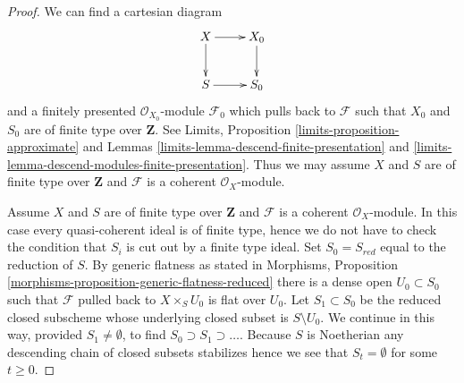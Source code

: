 \documentclass[10pt,a4paper]{amsart}
\theoremstyle{plain}
\theoremstyle{definition}
\theoremstyle{remark}
\numberwithin{equation}{subsection}
\begin{document}
\begin{proof}
We can find a cartesian diagram
$$
\xymatrix{
X \ar[d] \ar[r] & X_0 \ar[d] \\
S \ar[r] & S_0
}
$$
and a finitely presented $\mathcal{O}_{X_0}$-module $\mathcal{F}_0$
which pulls back to $\mathcal{F}$ such that $X_0$ and $S_0$ are of
finite type over $\mathbf{Z}$. See
Limits, Proposition \ref{limits-proposition-approximate} and
Lemmas \ref{limits-lemma-descend-finite-presentation} and
\ref{limits-lemma-descend-modules-finite-presentation}.
Thus we may assume $X$ and $S$ are of finite type over $\mathbf{Z}$
and $\mathcal{F}$ is a coherent $\mathcal{O}_X$-module.

\medskip\noindent
Assume $X$ and $S$ are of finite type over $\mathbf{Z}$
and $\mathcal{F}$ is a coherent $\mathcal{O}_X$-module.
In this case every quasi-coherent ideal is of finite type, hence
we do not have to check the condition that $S_i$ is cut out
by a finite type ideal. Set $S_0 = S_{red}$ equal to the reduction of $S$.
By generic flatness as stated in Morphisms, Proposition
\ref{morphisms-proposition-generic-flatness-reduced}
there is a dense open $U_0 \subset S_0$ such that $\mathcal{F}$
pulled back to $X \times_S U_0$ is flat over $U_0$.
Let $S_1 \subset S_0$ be the reduced closed subscheme whose
underlying closed subset is $S \setminus U_0$. We continue in this
way, provided $S_1 \not = \emptyset$, to find
$S_0 \supset S_1 \supset \ldots$. Because $S$
is Noetherian any descending chain of closed subsets stabilizes
hence we see that $S_t = \emptyset$ for some $t \geq 0$.
\end{proof}
\end{document}

